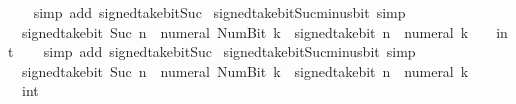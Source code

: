 \begin{isabellebody}
%
\isadelimproof
\ \ %
\endisadelimproof
%
\isatagproof
{}\isamarkupfalse%
\ {\isacharparenleft}{\kern0pt}simp\ add{\isacharcolon}{\kern0pt}\ signed{\isacharunderscore}{\kern0pt}take{\isacharunderscore}{\kern0pt}bit{\isacharunderscore}{\kern0pt}Suc{\isacharparenright}{\kern0pt}%
\endisatagproof
{\isafoldproof}%
%
\isadelimproof
\isanewline
%
\endisadelimproof
\isanewline
{}\isamarkupfalse%
\ signed{\isacharunderscore}{\kern0pt}take{\isacharunderscore}{\kern0pt}bit{\isacharunderscore}{\kern0pt}Suc{\isacharunderscore}{\kern0pt}minus{\isacharunderscore}{\kern0pt}bit{}\ {\isacharbrackleft}{\kern0pt}simp{\isacharbrackright}{\kern0pt}{\isacharcolon}{\kern0pt}\isanewline
\ \ {\isacartoucheopen}signed{\isacharunderscore}{\kern0pt}take{\isacharunderscore}{\kern0pt}bit\ {\isacharparenleft}{\kern0pt}Suc\ n{\isacharparenright}{\kern0pt}\ {\isacharparenleft}{\kern0pt}{\isacharminus}{\kern0pt}\ numeral\ {\isacharparenleft}{\kern0pt}Num{\isachardot}{\kern0pt}Bit{}\ k{\isacharparenright}{\kern0pt}{\isacharparenright}{\kern0pt}\ {\isacharequal}{\kern0pt}\ signed{\isacharunderscore}{\kern0pt}take{\isacharunderscore}{\kern0pt}bit\ n\ {\isacharparenleft}{\kern0pt}{\isacharminus}{\kern0pt}\ numeral\ k{\isacharparenright}{\kern0pt}\ {\isacharasterisk}{\kern0pt}\ {\isacharparenleft}{\kern0pt}{}\ {\isacharcolon}{\kern0pt}{\isacharcolon}{\kern0pt}\ int{\isacharparenright}{\kern0pt}{\isacartoucheclose}\isanewline
%
\isadelimproof
\ \ %
\endisadelimproof
%
\isatagproof
{}\isamarkupfalse%
\ {\isacharparenleft}{\kern0pt}simp\ add{\isacharcolon}{\kern0pt}\ signed{\isacharunderscore}{\kern0pt}take{\isacharunderscore}{\kern0pt}bit{\isacharunderscore}{\kern0pt}Suc{\isacharparenright}{\kern0pt}%
\endisatagproof
{\isafoldproof}%
%
\isadelimproof
\isanewline
%
\endisadelimproof
\isanewline
{}\isamarkupfalse%
\ signed{\isacharunderscore}{\kern0pt}take{\isacharunderscore}{\kern0pt}bit{\isacharunderscore}{\kern0pt}Suc{\isacharunderscore}{\kern0pt}minus{\isacharunderscore}{\kern0pt}bit{}\ {\isacharbrackleft}{\kern0pt}simp{\isacharbrackright}{\kern0pt}{\isacharcolon}{\kern0pt}\isanewline
\ \ {\isacartoucheopen}signed{\isacharunderscore}{\kern0pt}take{\isacharunderscore}{\kern0pt}bit\ {\isacharparenleft}{\kern0pt}Suc\ n{\isacharparenright}{\kern0pt}\ {\isacharparenleft}{\kern0pt}{\isacharminus}{\kern0pt}\ numeral\ {\isacharparenleft}{\kern0pt}Num{\isachardot}{\kern0pt}Bit{}\ k{\isacharparenright}{\kern0pt}{\isacharparenright}{\kern0pt}\ {\isacharequal}{\kern0pt}\ signed{\isacharunderscore}{\kern0pt}take{\isacharunderscore}{\kern0pt}bit\ n\ {\isacharparenleft}{\kern0pt}{\isacharminus}{\kern0pt}\ numeral\ k\ {\isacharminus}{\kern0pt}\ {}{\isacharparenright}{\kern0pt}\ {\isacharasterisk}{\kern0pt}\ {}\ {\isacharplus}{\kern0pt}\ {\isacharparenleft}{\kern0pt}{}\ {\isacharcolon}{\kern0pt}{\isacharcolon}{\kern0pt}\ int{\isacharparenright}{\kern0pt}{\isacartoucheclose}\isanewline

\end{isabellebody}
